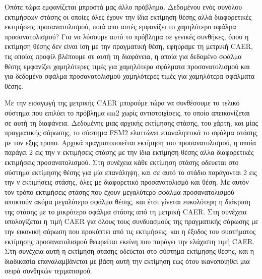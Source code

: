 \documentclass[a4paper,10pt]{article}
\begin{document}
Οπότε τώρα εμφανίζεται μπροστά μας άλλο πρόβλημα. Δεδομένου ενός συνόλου
εκτιμήσεων στάσης οι οποίες όλες έχουν την ίδια εκτίμηση θέσης αλλά
διαφορετικές εκτιμήσεις προσανατολισμού, ποιά απο αυτές εμφανίζει το χαμηλότερο
σφάλμα προσανατολισμού? Για να λύσουμε αυτό το πρόβλημα σε γενικές συνθήκες,
όπου η εκτίμηση θέσης δεν είναι ίση με την πραγματική θέση, εφηύραμε τη μετρική
CAER, τις οποίας προφίλ βλέπουμε σε αυτή τη διαφάνεια, η οποία για δεδομένο
σφάλμα θέσης εμφανίζει χαμηλότερες τιμές για χαμηλότερα σφάλματα
προσανατολισμού και για δεδομένο σφάλμα προσανατολισμού χαμηλότερες τιμές για
χαμηλότερα σφάλματα θέσης.



Με την εισαγωγή της μετρικής CAER μπορούμε τώρα να συνθέσουμε το τελικό σύστημα
που επιλύει το πρόβλημα sm2 χωρίς αντιστοιχίσεις, το οποίο απεικονίζεται σε
αυτή τη διαφάνεια. Δεδομένης μιας αρχικής εκτίμησης στάσης, του χάρτη, και μίας
πραγματικής σάρωσης, το σύστημα FSM2 ελαττώνει επαναληπτικά το σφάλμα στάσης με
τον εξης τροπο.  Αρχικά πραγματοποιείται εκτίμηση του προσανατολισμού, η οποία
παράγει 2 εις την ν εκτιμήσεις στάσης με την ίδια εκτίμηση θέσης αλλα
διαφορετικές εκτιμήσεις προσανατολισμού.  Στη συνέχεια κάθε εκτίμηση στάσης
οδευεται στο σύστημα εκτίμησης θέσης για μία επανάληψη, και σε αυτό το στάδιο
παράγονται 2 εις την ν εκτιμήσεις στάσης, όλες με διαφορετικό προσανατολισμό
και θέση. Με αυτόν τον τρόπο εκτιμήσεις στάσης που έχουν μεγαλύτερο σφάλμα
προσανατολισμού αποκτούν ακόμα μεγαλύτερο σφάλμα θέσης, και έτσι γίνεται
ευκολότερη η διάκριση της στάσης με το μικρότερο σφάλμα στάσης από τη μετρική
CAER.  Στη συνέχεια υπολογίζεται η τιμή CAER για όλους τους συνδυασμούς της
πραγματικής σάρωσης με την εικονική σάρωση που προκύπτει από τις εκτιμήσεις,
και η έξοδος του συστήματος εκτίμησης προσανατολισμού θεωρείται εκείνη που
παράγει την ελάχιστη τιμή CAER. Στη συνέχεια αυτή η εκτίμηση στάσης οδεύεται
στο σύστημα εκτίμησης θέσης, και η διαδικασία επαναλαμβάνεται με βάση αυτή την
εκτίμηση εως ότου ικανοποιηθεί μια σειρά συνθηκών τερματισμού.
\end{document}
